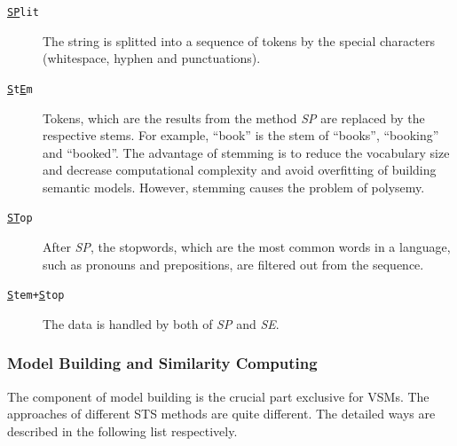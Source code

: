 \begin{description}
\item[\texttt{\underline{SP}lit}] The string is splitted into a sequence of tokens by the special characters (whitespace, hyphen and punctuations). 
\item[\texttt{\underline{S}t\underline{E}m}] Tokens, which are the results from the method \textit{SP} are replaced by the respective stems. For example, ``book'' is the stem of ``books'', ``booking'' and ``booked''. The advantage of stemming is to reduce the vocabulary size and decrease computational complexity and avoid overfitting of building semantic models. However, stemming causes the problem of polysemy. 
\item[\texttt{\underline{ST}op}] After \textit{SP}, the stopwords, which are the most common words in a language, such as pronouns and prepositions, are filtered out from the sequence. 
\item[\texttt{\underline{S}tem+\underline{S}top}] The data is handled by both of \textit{SP} and \textit{SE}. 
\end{description}

\subsubsection{Model Building and Similarity Computing}

The component of model building is the crucial part exclusive for VSMs. The approaches of different STS methods are quite different. The detailed ways are described in the following list respectively.

